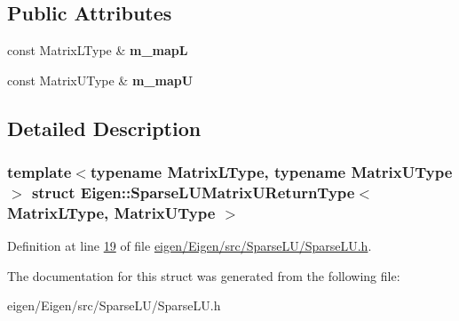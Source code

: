 \subsection*{Public Attributes}
\begin{DoxyCompactItemize}
\item 
\mbox{\label{struct_eigen_1_1_sparse_l_u_matrix_u_return_type_a92f86664510b4a7446b87726a1aea275}} 
const Matrix\+L\+Type \& {\bfseries m\+\_\+mapL}
\item 
\mbox{\label{struct_eigen_1_1_sparse_l_u_matrix_u_return_type_aeef1170c37a324887a076a5b13bd1354}} 
const Matrix\+U\+Type \& {\bfseries m\+\_\+mapU}
\end{DoxyCompactItemize}


\subsection{Detailed Description}
\subsubsection*{template$<$typename Matrix\+L\+Type, typename Matrix\+U\+Type$>$\newline
struct Eigen\+::\+Sparse\+L\+U\+Matrix\+U\+Return\+Type$<$ Matrix\+L\+Type, Matrix\+U\+Type $>$}



Definition at line \hyperlink{eigen_2_eigen_2src_2_sparse_l_u_2_sparse_l_u_8h_source_l00019}{19} of file \hyperlink{eigen_2_eigen_2src_2_sparse_l_u_2_sparse_l_u_8h_source}{eigen/\+Eigen/src/\+Sparse\+L\+U/\+Sparse\+L\+U.\+h}.



The documentation for this struct was generated from the following file\+:\begin{DoxyCompactItemize}
\item 
eigen/\+Eigen/src/\+Sparse\+L\+U/\+Sparse\+L\+U.\+h\end{DoxyCompactItemize}
